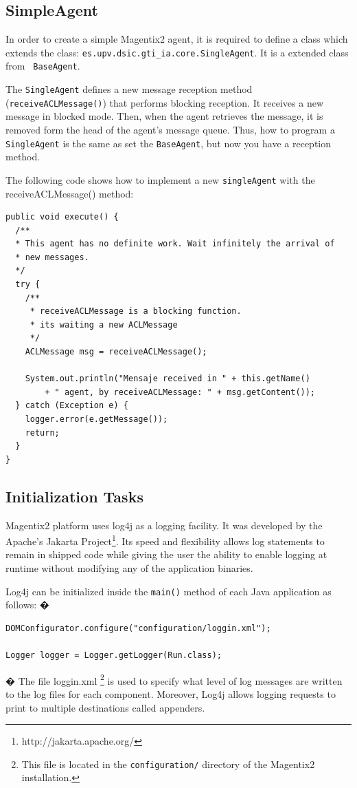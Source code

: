 \subsection{SimpleAgent}\label{sec:SimpleAgent}
In order to create a simple Magentix2 agent, it is required to define a class which extends the class: \lstinline|es.upv.dsic.gti_ia.core.SingleAgent|. It is a extended class from \lstinline| BaseAgent|. 

The \lstinline|SingleAgent| defines a new message reception method (\lstinline|receiveACLMessage()|) that performs blocking reception. It receives a new message in blocked mode. Then, when the agent retrieves the message, it is removed form the head of the agent's message queue. Thus, how to program a \lstinline|SingleAgent| is the same as set the \lstinline|BaseAgent|, but now you have a reception method.


The following code shows how to implement a new \lstinline|singleAgent| with the receiveACLMessage() method:
\begin{lstlisting}
public void execute() {
  /**
  * This agent has no definite work. Wait infinitely the arrival of
  * new messages.
  */
  try {
	/**
	 * receiveACLMessage is a blocking function.
	 * its waiting a new ACLMessage
	 */
	ACLMessage msg = receiveACLMessage();

	System.out.println("Mensaje received in " + this.getName()
		+ " agent, by receiveACLMessage: " + msg.getContent());
  } catch (Exception e) {
	logger.error(e.getMessage());
	return;
  }
}

\end{lstlisting}
\subsection{Initialization Tasks}
Magentix2 platform uses log4j as a logging facility. It was developed by the  Apache's Jakarta Project\footnote{http://jakarta.apache.org/}. Its speed and flexibility allows log statements to remain in shipped code while giving the user the ability to enable logging at runtime without modifying any of the application binaries.

Log4j can be initialized inside the \lstinline|main()| method of each Java application as follows:
�
\begin{lstlisting}
DOMConfigurator.configure("configuration/loggin.xml");

Logger logger = Logger.getLogger(Run.class);
\end{lstlisting}
�
The file loggin.xml \footnote{This file is located in the \texttt{configuration/} directory of the Magentix2 installation.} is used to specify what level of log messages are written to the log files for each component. Moreover, Log4j allows logging requests to print to multiple destinations called appenders.


